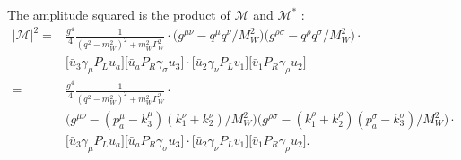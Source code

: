 \noindent The amplitude squared is the product of $\mathcal{M}$  and $\mathcal{M^*} $ :
\begin{equation}
\begin{split}
	|\mathcal{M}|^2  = &  \frac{g^4}{4} \frac{1}{ (q^2-m^2_{W})^2 +  m^2_W \Gamma^2_W } \cdot \big (g^{\mu \nu} - q^\mu q^\nu/M^2_{W} \big) \big(g^{\rho \sigma} - q^\rho q^\sigma / M^2_{W}\big)  \cdot  \\
    &\big[ \bar{u}_3 \gamma_\mu P_L u_a \big]  \big[ \bar{u}_a P_R \gamma_\sigma  u_3 \big] \cdot \big[ \bar{u}_2 \gamma_\nu P_L v_1 \big]  \big[ \bar{v}_1 P_R \gamma_\rho  u_2 \big] \\
    = & \frac{g^4}{4} \frac{1}{ (q^2-m^2_{W})^2 +  m^2_W \Gamma^2_W } \cdot \\
    & \big (g^{\mu \nu} - (p_a^\mu-k_3^\mu) (k_1^\nu+k_2^\nu) /M^2_{W} \big) \big(g^{\rho \sigma} - (k_1^\rho+k_2^\rho) (p_a^\sigma -k_3^\sigma )/ M^2_{W}\big)  \cdot \\
    & \big[ \bar{u}_3 \gamma_\mu P_L u_a \big]  \big[ \bar{u}_a P_R \gamma_\sigma  u_3 \big] \cdot \big[ \bar{u}_2 \gamma_\nu P_L v_1 \big]  \big[ \bar{v}_1 P_R \gamma_\rho  u_2 \big] .
\end{split}
\end{equation}

